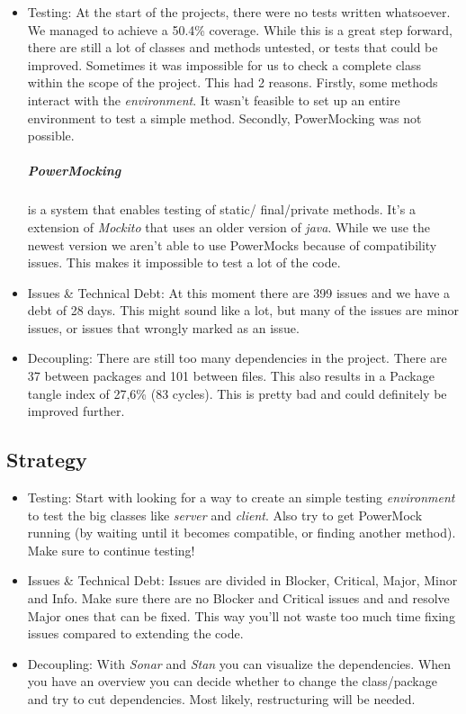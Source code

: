 \begin{itemize}
	\item Testing: At the start of the projects, there were no tests written whatsoever. We managed to achieve a 50.4\% coverage. While this is a great step forward, there are still a lot of classes and methods untested, or tests that could be improved. Sometimes it was impossible for us to check a complete class within the scope of the project. This had 2 reasons. Firstly, some methods interact with the \emph{environment}. It wasn't feasible to set up an entire environment to test a simple method. Secondly,  PowerMocking was not possible.

\subparagraph*{PowerMocking}is a system that enables testing of static/ final/private methods. It's a extension of \emph{Mockito} that uses an older version of \emph{java}. While we use the newest version we aren't able to use PowerMocks because of compatibility issues. This makes it impossible to test a lot of the code. 

	\item Issues \& Technical Debt: At this moment there are 399 issues and we have a debt of 28 days. This might sound like a lot, but many of the issues are minor issues, or issues that wrongly marked as an issue.  
	
	\item Decoupling: There are still too many dependencies in the project. There are 37 between packages and 101 between files. This also results in a Package tangle index of	27,6\%  (83 cycles). This is pretty bad and could definitely be improved further.
	
\end{itemize}
	
\subsection*{Strategy}
\begin{itemize}
	\item Testing: Start with looking for a way to create an simple testing \emph{environment} to test the big classes like \emph{server} and \emph{client}. Also try to get PowerMock running (by waiting until it becomes compatible, or finding another method). Make sure to continue testing! 
	\item Issues \& Technical Debt: Issues are divided in Blocker, Critical, Major, Minor and Info. Make sure there are no Blocker and Critical issues and and resolve Major ones that can be fixed. This way you'll not waste too much time fixing issues compared to extending the code.  
	\item Decoupling: With \emph{Sonar} and \emph{Stan} you can visualize the dependencies. When you have an overview you can decide whether to change the class/package and try to cut dependencies. Most likely, restructuring will be needed. 
\end{itemize}

